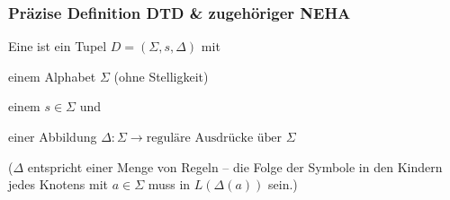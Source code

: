     \begin{frame}
      \frametitle{Präzise Definition DTD \& zugehöriger NEHA}
      
      \begin{Definition}
        Eine  ist ein Tupel $D = (\Sigma,s,\Delta)$
        mit
        \begin{Itemize}
          \item
            einem Alphabet $\Sigma$ (ohne Stelligkeit)
          \item
            einem  $s \in \Sigma$ und
          \item
            einer Abbildung $\Delta : \Sigma \to \text{reguläre Ausdrücke über $\Sigma$}$

        \end{Itemize}
      \end{Definition}
      
      \par\smallskip
      \begin{small}
        ($\Delta$ entspricht einer Menge von Regeln --
        die Folge der Symbole in den Kindern jedes
        Knotens mit $a \in \Sigma$
        muss in $L(\Delta(a))$ sein.)
        \par
      \end{small}

      \par\bigskip

    \end{frame}

